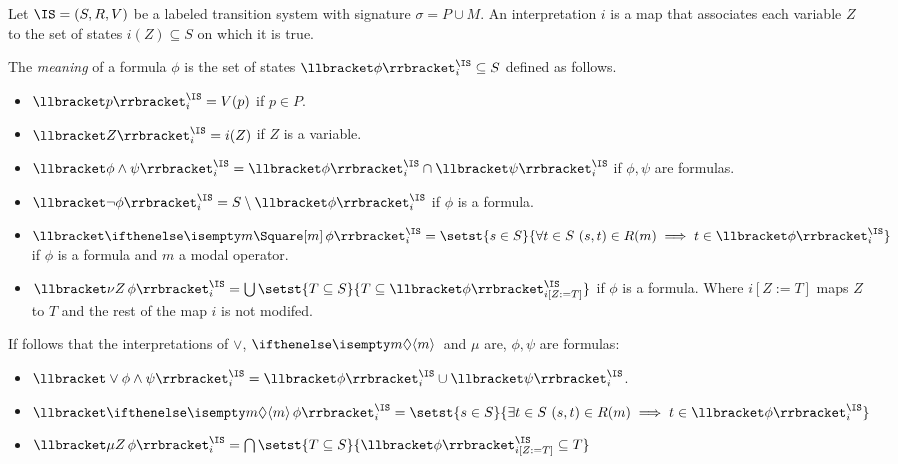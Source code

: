 \begin{definition}
    Let $\IS = (S, R, V)$ be a labeled transition system with signature $\sigma = P \cup M$.
    An interpretation $i$ is a map that associates each variable $Z$
    to the set of states $i(Z) \subseteq S$ on which it is true.

    The \emph{meaning} of a formula $\phi$ is the set of states $\Meaning{\phi}^\IS_i \subseteq S$
    defined as follows.
    \begin{itemize}
        \item $\Meaning{p}^\IS_i = V(p)$ if $p \in P$.
        \item $\Meaning{Z}^\IS_i = i(Z)$ if $Z$ is a variable.
        \item $\Meaning{\phi \wedge \psi}^\IS_i = \Meaning{\phi}^\IS_i \cap \Meaning{\psi}^\IS_i$
            if $\phi, \psi$ are formulas.
        \item $\Meaning{\neg \phi}^\IS_i = S \setminus \Meaning{\phi}^\IS_i$
            if $\phi$ is a formula.
        \item $\Meaning{\boite m \phi}^\IS_i = \setst{s \in S}{
            \forall t \in S~ (s, t) \in R(m) \implies t \in \Meaning{\phi}^\IS_i}$
            if $\phi$ is a formula and $m$ a modal operator.
        \item $\Meaning{\nu Z \, \phi}^\IS_i = \bigcup \setst{T \subseteq S}{T \subseteq \Meaning{\phi}^\IS_{i[Z := T]}}$
            if $\phi$ is a formula. Where $i[Z := T]$ maps $Z$ to $T$ and the rest of the map $i$ is not modifed.
    \end{itemize}
    If follows that the interpretations of $\vee$, $\diam{m}$ and $\mu$
    are, $\phi, \psi$ are formulas:
    \begin{itemize}
        \item $\Meaning{\vee \phi \wedge \psi}^\IS_i = \Meaning{\phi}^\IS_i \cup \Meaning{\psi}^\IS_i$.
        \item $\Meaning{\diam m \phi}^\IS_i = \setst{s \in S}{\exists t \in S~ (s, t) \in R(m) \implies t \in \Meaning{\phi}^\IS_i}$
        \item $\Meaning{\mu Z\, \phi}^\IS_i = \bigcap \setst{T \subseteq S}{\Meaning{\phi}^\IS_{i[Z := T]} \subseteq T}$
    \end{itemize}
\end{definition}

